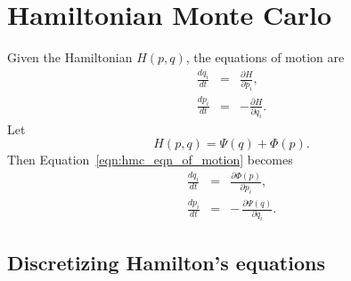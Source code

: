 % 
% 
% 
% 
% 
%

\section{Hamiltonian Monte Carlo}
Given the Hamiltonian $H(p,q)$, the equations of motion are
\begin{eqnarray}
\label{eqn:hmc_eqn_of_motion}
\frac{dq_i}{dt} &=& \frac{\partial H}{\partial p_i}, \\
\frac{dp_i}{dt} &=& -\frac{\partial H}{\partial q_i}.
\end{eqnarray}
Let
\begin{equation}
H(p,q) = \Psi(q) + \Phi(p).
\end{equation}
Then Equation~\ref{eqn:hmc_eqn_of_motion} becomes
\begin{eqnarray}
\label{eqn:hmc_deriv_psi_phi}
\frac{dq_i}{dt} &=&  \frac{\partial \Phi(p)}{\partial p_i}, \\
\frac{dp_i}{dt} &=& -\,\frac{\partial \Psi(q)}{\partial q_i}.
\end{eqnarray}

\subsection{Discretizing Hamilton's equations}

